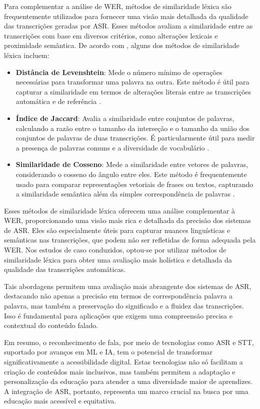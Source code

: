 Para complementar a análise de WER, métodos de similaridade léxica são frequentemente utilizados para fornecer uma visão mais detalhada da qualidade das transcrições geradas por ASR. Esses métodos avaliam a similaridade entre as transcrições com base em diversos critérios, como alterações lexicais e proximidade semântica. De acordo com , alguns dos métodos de similaridade léxica incluem:

\begin{itemize}
\item \textbf{Distância de Levenshtein}: Mede o número mínimo de operações necessárias para transformar uma palavra na outra. Este método é útil para capturar a similaridade em termos de alterações literais entre as transcrições automática e de referência \cite{levens-1,levens-2}.
\item \textbf{Índice de Jaccard}: Avalia a similaridade entre conjuntos de palavras, calculando a razão entre o tamanho da interseção e o tamanho da união dos conjuntos de palavras de duas transcrições. É particularmente útil para medir a presença de palavras comuns e a diversidade de vocabulário \cite{jaccard-1,jaccard-2}.
\item \textbf{Similaridade de Cosseno}: Mede a similaridade entre vetores de palavras, considerando o cosseno do ângulo entre eles. Este método é frequentemente usado para comparar representações vetoriais de frases ou textos, capturando a similaridade semântica além da simples correspondência de palavras \cite{cosseno-1,cosseno-2,cosseno-3}.
\end{itemize}

Esses métodos de similaridade léxica oferecem uma análise complementar à WER, proporcionando uma visão mais rica e detalhada da precisão dos sistemas de ASR. Eles são especialmente úteis para capturar nuances linguísticas e semânticas nas transcrições, que podem não ser refletidas de forma adequada pela WER. Nos estudos de caso conduzidos, optou-se por utilizar métodos de similaridade léxica para obter uma avaliação mais holística e detalhada da qualidade das transcrições automáticas.

Tais abordagens permitem uma avaliação mais abrangente dos sistemas de ASR, destacando não apenas a precisão em termos de correspondência palavra a palavra, mas também a preservação do significado e a fluidez das transcrições. Isso é fundamental para aplicações que exigem uma compreensão precisa e contextual do conteúdo falado.

Em resumo, o reconhecimento de fala, por meio de tecnologias como ASR e STT, suportado por avanços em ML e IA, tem o potencial de transformar significativamente a acessibilidade digital. Estas tecnologias não só facilitam a criação de conteúdos mais inclusivos, mas também permitem a adaptação e personalização da educação para atender a uma diversidade maior de aprendizes. A integração de ASR, portanto, representa um marco crucial na busca por uma educação mais acessível e equitativa.

